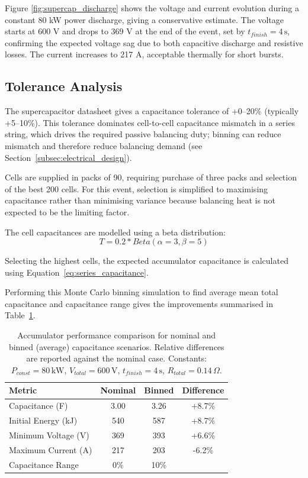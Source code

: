 \documentclass[11pt, a4paper]{report}
\numberwithin{equation}{section}
\begin{document}
\begin{refsection}
Figure \ref{fig:supercap_discharge} shows the voltage and current evolution during a constant 80 kW power discharge, giving a conservative estimate. The voltage starts at 600 V and drops to 369 V at the end of the event, set by $t_{finish}=4\,\text{s}$, confirming the expected voltage sag due to both capacitive discharge and resistive losses. The current increases to 217 A, acceptable thermally for short bursts.

\subsection{Tolerance Analysis}

The supercapacitor datasheet gives a capacitance tolerance of +0--20\% (typically +5--10\%). This tolerance dominates cell-to-cell capacitance mismatch in a series string, which drives the required passive balancing duty; binning can reduce mismatch and therefore reduce balancing demand (see Section~\ref{subsec:electrical_design}).

Cells are supplied in packs of 90, requiring purchase of three packs and selection of the best 200 cells. For this event, selection is simplified to maximising capacitance rather than minimising variance because balancing heat is not expected to be the limiting factor.

The cell capacitances are modelled using a beta distribution:
\begin{equation*}
T = 0.2*Beta(\alpha = 3, \beta = 5)
\end{equation*}

Selecting the highest cells, the expected accumulator capacitance is calculated using Equation~\eqref{eq:series_capacitance}.

Performing this Monte Carlo binning simulation to find average mean total capacitance and capacitance range gives the improvements summarised in Table~\ref{tab:capacitance_binning_results}.

\begin{table}[htbp]
    \centering
    \caption{Accumulator performance comparison for nominal and binned (average) capacitance scenarios. Relative differences are reported against the nominal case. Constants: $P_{const}=80\,\mathrm{kW}$, $V_{total}=600\,\mathrm{V}$, $t_{finish}=4\,\mathrm{s}$, $R_{total}=0.14\,\Omega$.}
    \label{tab:capacitance_binning_results}
    \footnotesize
    \begin{tabular}{|l|c|c|c|}
        \hline
        \textbf{Metric} & \textbf{Nominal} & \textbf{Binned} & \textbf{Difference} \\
        \hline
        Capacitance (F) & 3.00 & 3.26 & +8.7\% \\
        Initial Energy (kJ) & 540 & 587 & +8.7\% \\
        Minimum Voltage (V) & 369 & 393 & +6.6\% \\
        Maximum Current (A) & 217 & 203 & -6.2\% \\
        Capacitance Range & 0\% & 10\% & \\
        \hline
    \end{tabular}
\end{table}


\end{refsection}
\end{document}
